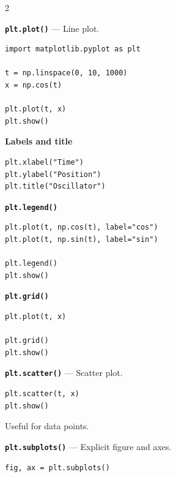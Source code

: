 \documentclass[10pt,a4paper]{article}
\begin{document}
\begin{multicols}{2}
\begin{card}
\textbf{\texttt{plt.plot()}} --- Line plot.

\begin{lstlisting}[style=pythonstyle]
import matplotlib.pyplot as plt

t = np.linspace(0, 10, 1000)
x = np.cos(t)

plt.plot(t, x)
plt.show()
\end{lstlisting}
\end{card}

\begin{card}
\textbf{Labels and title}

\begin{lstlisting}[style=pythonstyle]
plt.xlabel("Time")
plt.ylabel("Position")
plt.title("Oscillator")
\end{lstlisting}
\end{card}

\begin{card}
\textbf{\texttt{plt.legend()}}

\begin{lstlisting}[style=pythonstyle]
plt.plot(t, np.cos(t), label="cos")
plt.plot(t, np.sin(t), label="sin")

plt.legend()
plt.show()
\end{lstlisting}
\end{card}

\begin{card}
\textbf{\texttt{plt.grid()}}

\begin{lstlisting}[style=pythonstyle]
plt.plot(t, x)

plt.grid()
plt.show()
\end{lstlisting}
\end{card}

\begin{card}
\textbf{\texttt{plt.scatter()}} --- Scatter plot.

\begin{lstlisting}[style=pythonstyle]
plt.scatter(t, x)
plt.show()
\end{lstlisting}

Useful for data points.
\end{card}

\begin{card}
\textbf{\texttt{plt.subplots()}} --- Explicit figure and axes.

\begin{lstlisting}[style=pythonstyle]
fig, ax = plt.subplots()


\end{lstlisting}
\end{card}
\end{multicols}
\end{document}
